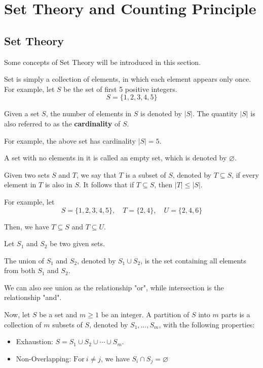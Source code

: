 \chapter{Set Theory and Counting Principle}

\section{Set Theory}

Some concepts of Set Theory will be introduced in this section.

Set is simply a collection of elements, in which each element appears only once. 
For example, let \(S\) be the set of first 5 positive integers.
\[
    S = \{1, 2, 3, 4, 5\}
\]

Given a set \(S\), the number of elements in \(S\) is denoted by \(\vert S \vert \). The quantity \(\vert S \vert \) is also referred to as the \textbf{cardinality} of \(S\).

For example, the above set has cardinality \(\vert S \vert = 5\). 

A set with no elements in it is called an empty set, which is denoted by \(\varnothing\).

Given two sets \(S\) and \(T\), we say that \(T\) is a subset of \(S\), denoted by \(T \subseteq S\), if every element in \(T\) is also in \(S\). It follows that if \(T \subseteq S\), then \(\vert T \vert \leq \vert S \vert \). 

For example, let
\[
    S = \{1, 2, 3, 4, 5\},\quad T = \{2, 4\}, \quad U = \{2, 4, 6\}
\]

Then, we have \(T \subseteq S\) and \(T \subseteq U\).

Let \(S_1\) and \(S_2\) be two given sets. 

The union of \(S_1\) and \(S_2\), denoted by \(S_1 \cup  S_2\), is the set containing all elements from both \(S_1\) and \(S_2\). 

We can also see union as the relationship "or", while intersection is the relationship "and".

Now, let \(S\) be a set and \(m \geq 1\) be an integer. A partition of \(S\) into \(m\) parts is a collection of \(m\) subsets of \(S\), denoted by \(S_1, \dots, S_m\), with the following properties:
\begin{itemize}
    \item Exhaustion: \(S = S_1 \cup S_2 \cup \cdots \cup S_m.\)
    \item Non-Overlapping: \(\text{For}\ i \neq j\), we have \(S_i \cap S_j = \varnothing\)
\end{itemize}


